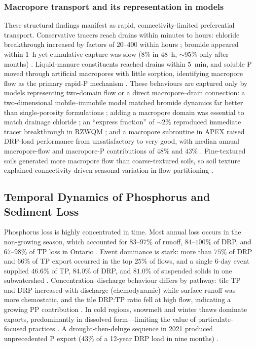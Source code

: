 \documentclass[11pt]{article}
\begin{document}
\subsubsection{Macropore transport and its representation in models}

These structural findings manifest as rapid, connectivity-limited
preferential transport. Conservative tracers reach drains within minutes to
hours: chloride breakthrough increased by factors of $20$--$400$ within hours
\parencite{Villholth1998}; bromide appeared within $1$~h yet cumulative
capture was slow ($8\%$ in $48$~h, $\sim95\%$ only after months)
\parencite{Frey2012,Kladivko2023}. Liquid-manure constituents reached drains
within $5$~min, and soluble P moved through artificial macropores with little
sorption, identifying macropore flow as the primary rapid-P mechanism
\parencite{Stamm2002,Geohring2001}. These behaviours are captured only by
models representing two-domain flow or a direct macropore--drain connection:
a two-dimensional mobile--immobile model matched bromide dynamics far better
than single-porosity formulations \parencite{Köhne2006}; adding a macropore
domain was essential to match drainage chloride \parencite{Villholth1998b};
an ``express fraction'' of $\sim2\%$ reproduced immediate tracer breakthrough
in RZWQM \parencite{Fox2004,Fox2007b}; and a macropore subroutine in APEX
raised DRP-load performance from unsatisfactory to very good, with median
annual macropore-flow and macropore-P contributions of $48\%$ and $43\%$
\parencite{Ford2017}. Fine-textured soils generated more macropore flow than
coarse-textured soils, so soil texture explained connectivity-driven seasonal
variation in flow partitioning \parencite{Poon2021,Holbak2021}.

\subsection{Temporal Dynamics of Phosphorus and Sediment Loss}

Phosphorus loss is highly concentrated in time. Most annual loss occurs in
the non-growing season, which accounted for $83$--$97\%$ of runoff,
$84$--$100\%$ of DRP, and $67$--$98\%$ of TP loss in Ontario
\parencite{VanEsbroeck2016,Qi2018}. Event dominance is stark: more than
$75\%$ of DRP and $66\%$ of TP export occurred in the top $25\%$ of flows,
and a single 6-day event supplied $46.6\%$ of TP, $84.0\%$ of DRP, and
$81.0\%$ of suspended solids in one subwatershed \parencite{Brendel2019}.
Concentration--discharge behaviour differs by pathway: tile TP and DRP
increased with discharge (chemodynamic) while surface runoff was more
chemostatic, and the tile DRP:TP ratio fell at high flow, indicating a
growing PP contribution \parencite{Osterholz2020}. In cold regions, snowmelt
and winter thaws dominate exports, predominantly in dissolved form---limiting
the value of particulate-focused practices \parencite{Baulch2019,Clement2017}.
A drought-then-deluge sequence in 2021 produced unprecedented P export
($43\%$ of a 12-year DRP load in nine months) \parencite{Millar2025,Mumbi2025b}.
\end{document}
